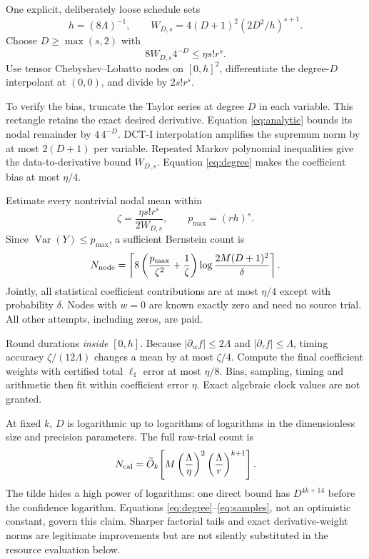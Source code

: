 \documentclass[11pt]{article}
\begin{document}
One explicit, deliberately loose schedule sets
\[
h=(8\Lambda)^{-1},\qquad
W_{D,s}=4(D+1)^2(2D^2/h)^{s+1}.
\]
Choose \(D\ge\max(s,2)\) with
\begin{equation}
8W_{D,s}4^{-D}\le\eta s!r^s.
\label{eq:degree}
\end{equation}
Use tensor Chebyshev--Lobatto nodes on \([0,h]^2\), differentiate the
degree-\(D\) interpolant at \((0,0)\), and divide by \(2s!r^s\).

To verify the bias, truncate the Taylor series at degree \(D\) in each
variable. This rectangle retains the exact desired derivative.
Equation \eqref{eq:analytic} bounds its nodal remainder by \(4\,4^{-D}\).
DCT-I interpolation amplifies the supremum norm by at most \(2(D+1)\)
per variable. Repeated Markov polynomial inequalities give the
data-to-derivative bound \(W_{D,s}\). Equation \eqref{eq:degree} makes the
coefficient bias at most \(\eta/4\).

Estimate every nontrivial nodal mean within
\[
\zeta=\frac{\eta s!r^s}{2W_{D,s}},\qquad p_{\max}=(rh)^s.
\]
Since \(\operatorname{Var}(Y)\le p_{\max}\), a sufficient Bernstein count is
\begin{equation}
N_{\rm node}=\left\lceil
8\left(\frac{p_{\max}}{\zeta^2}+\frac1\zeta\right)
\log\frac{2M(D+1)^2}{\delta}\right\rceil .
\label{eq:samples}
\end{equation}
Jointly, all statistical coefficient contributions are at most \(\eta/4\)
except with probability \(\delta\). Nodes with \(w=0\) are known exactly
zero and need no source trial. All other attempts, including zeros, are paid.

Round durations \emph{inside} \([0,h]\). Because
\(|\partial_wf|\le2\Lambda\) and \(|\partial_\tau f|\le\Lambda\),
timing accuracy \(\zeta/(12\Lambda)\) changes a mean by at most \(\zeta/4\).
Compute the final coefficient weights with certified total \(\ell_1\)
error at most \(\eta/8\). Bias, sampling, timing and arithmetic then fit
within coefficient error \(\eta\). Exact algebraic clock values are not granted.

At fixed \(k\), \(D\) is logarithmic up to logarithms of logarithms in the
dimensionless size and precision parameters. The full raw-trial count is
\begin{equation}
N_{\rm cal}=\widetilde O_k\!\left[
M\left(\frac{\Lambda}{\eta}\right)^2
\left(\frac{\Lambda}{r}\right)^{k+1}\right].
\label{eq:poly}
\end{equation}
The tilde hides a high power of logarithms: one direct bound has
\(D^{4k+14}\) before the confidence logarithm.
Equations \eqref{eq:degree}--\eqref{eq:samples}, not an optimistic constant,
govern this claim. Sharper factorial tails and exact derivative-weight
norms are legitimate improvements but are not silently substituted in
the resource evaluation below.
\end{document}
